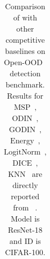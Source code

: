 \begin{table}[t!]
{\begin{tabular}{l*{6}c|*{10}c}
\end{tabular}}
\vspace{0.2cm}
\caption{\small Comparison of \name with other competitive baselines on Open-OOD~\cite{yang2022openood} detection benchmark. Results for MSP~\cite{hendrycks2016baseline}, ODIN~\cite{liang2018enhancing}, GODIN~\cite{hsu2020generalized}, Energy~\cite{liu2020energy}, LogitNorm~\cite{wei2022mitigating}, DICE~\cite{sun2022dice}, KNN~\cite{sun2022knn} are directly reported from ~\cite{yang2022openood}. Model is ResNet-18 and ID is CIFAR-100.}
\label{tab:openood_c100}
\end{table}
